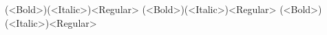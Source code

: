 \documentclass[
	12pt,
	a4paper,
	kosection,
	footnote,
	nobookmarks,
	microtype,
]{oblivoir}
\def\cs#1{\texttt{\textbackslash #1}}
\begin{document}
\begin{boxedverbatim}
\setkormainfont(<Bold>)(<Italic>){<Regular>}
\setkorsansfont(<Bold>)(<Italic>){<Regular>}
\setkormonofont(<Bold>)(<Italic>){<Regular>}
\end{boxedverbatim}
%
%
%
%
%
\end{document}
